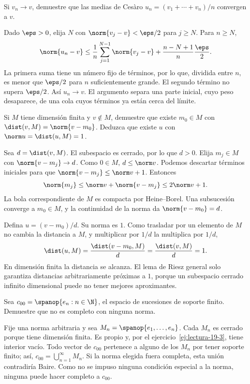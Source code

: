 \begin{ejercicio}\label{ej:lectura-19-7}
Si $v_n\to v$, demuestre que las medias de Cesàro $u_n=(v_1+\cdots+v_n)/n$ convergen a $v$.
\end{ejercicio}
\begin{solucion}
Dado $\eps>0$, elija $N$ con $\norm{v_j-v}<\eps/2$ para $j\geq N$. Para $n\geq N$,
\[
 \norm{u_n-v}\leq
 \frac1n\sum_{j=1}^{N-1}\norm{v_j-v}
 +\frac{n-N+1}{n}\frac\eps2.
\]
La primera suma tiene un número fijo de términos, por lo que, dividida entre $n$, es menor que $\eps/2$ para $n$ suficientemente grande. El segundo término no supera $\eps/2$. Así $u_n\to v$. El argumento separa una parte inicial, cuyo peso desaparece, de una cola cuyos términos ya están cerca del límite.
\end{solucion}

\begin{ejercicio}\label{ej:lectura-22-4}
Si $M$ tiene dimensión finita y $v\notin M$, demuestre que existe $m_0\in M$ con $\dist(v,M)=\norm{v-m_0}$. Deduzca que existe $u$ con $\norm u=\dist(u,M)=1$.
\end{ejercicio}
\begin{solucion}
Sea $d=\dist(v,M)$. El subespacio es cerrado, por lo que $d>0$. Elija $m_j\in M$ con $\norm{v-m_j}\to d$. Como $0\in M$, $d\leq\norm v$. Podemos descartar términos iniciales para que $\norm{v-m_j}\leq\norm v+1$. Entonces
\[
 \norm{m_j}\leq\norm v+\norm{v-m_j}\leq2\norm v+1.
\]
La bola correspondiente de $M$ es compacta por Heine--Borel. Una subsucesión converge a $m_0\in M$, y la continuidad de la norma da $\norm{v-m_0}=d$.

Defina $u=(v-m_0)/d$. Su norma es $1$. Como trasladar por un elemento de $M$ no cambia la distancia a $M$, y multiplicar por $1/d$ la multiplica por $1/d$,
\[
 \dist(u,M)=\frac{\dist(v-m_0,M)}d=\frac{\dist(v,M)}d=1.
\]
En dimensión finita la distancia se alcanza. El lema de Riesz general solo garantiza distancias arbitrariamente próximas a $1$, porque un subespacio cerrado infinito dimensional puede no tener mejores aproximantes.
\end{solucion}

\begin{ejercicio}\label{ej:lectura-22-5}
Sea $c_{00}=\spanop\{e_n:n\in\N\}$, el espacio de sucesiones de soporte finito. Demuestre que no es completo con ninguna norma.
\end{ejercicio}
\begin{solucion}
\enlargethispage{\baselineskip}
Fije una norma arbitraria y sea $M_n=\spanop\{e_1,\ldots,e_n\}$. Cada $M_n$ es cerrado porque tiene dimensión finita. Es propio y, por el ejercicio~\ref{ej:lectura-19-3}, tiene interior vacío. Todo vector de $c_{00}$ pertenece a alguno de los $M_n$ por tener soporte finito; así, $c_{00}=\bigcup_{n=1}^{\infty}M_n$. Si la norma elegida fuera completa, esta unión contradiría Baire. Como no se impuso ninguna condición especial a la norma, ninguna puede hacer completo a $c_{00}$.
\end{solucion}

